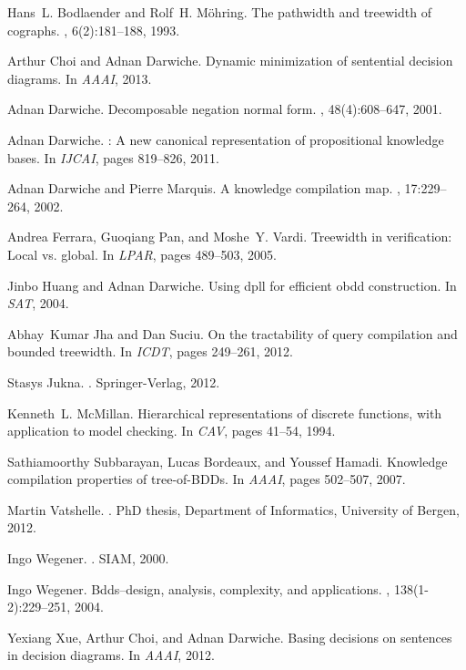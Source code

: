 \documentclass{article}
\begin{document}
\begin{thebibliography}{10}

Hans~L. Bodlaender and Rolf~H. M{\"o}hring.
\newblock The pathwidth and treewidth of cographs.
, 6(2):181--188, 1993.

Arthur Choi and Adnan Darwiche.
\newblock Dynamic minimization of sentential decision diagrams.
\newblock In {\em AAAI}, 2013.

Adnan Darwiche.
\newblock Decomposable negation normal form.
, 48(4):608--647, 2001.

Adnan Darwiche.
: A new canonical representation of propositional knowledge
  bases.
\newblock In {\em IJCAI}, pages 819--826, 2011.

Adnan Darwiche and Pierre Marquis.
\newblock A knowledge compilation map.
, 17:229--264, 2002.

Andrea Ferrara, Guoqiang Pan, and Moshe~Y. Vardi.
\newblock Treewidth in verification: Local vs. global.
\newblock In {\em LPAR}, pages 489--503, 2005.

Jinbo Huang and Adnan Darwiche.
\newblock Using dpll for efficient obdd construction.
\newblock In {\em SAT}, 2004.

Abhay~Kumar Jha and Dan Suciu.
\newblock On the tractability of query compilation and bounded treewidth.
\newblock In {\em ICDT}, pages 249--261, 2012.

Stasys Jukna.
.
\newblock Springer-Verlag, 2012.

Kenneth~L. McMillan.
\newblock Hierarchical representations of discrete functions, with application
  to model checking.
\newblock In {\em CAV}, pages 41--54, 1994.

Sathiamoorthy Subbarayan, Lucas Bordeaux, and Youssef Hamadi.
\newblock Knowledge compilation properties of tree-of-{B}{D}{D}s.
\newblock In {\em AAAI}, pages 502--507, 2007.

Martin Vatshelle.
.
\newblock PhD thesis, Department of Informatics, University of Bergen, 2012.

Ingo Wegener.
.
\newblock SIAM, 2000.

Ingo Wegener.
\newblock Bdds--design, analysis, complexity, and applications.
, 138(1-2):229--251, 2004.

Yexiang Xue, Arthur Choi, and Adnan Darwiche.
\newblock Basing decisions on sentences in decision diagrams.
\newblock In {\em AAAI}, 2012.

\end{thebibliography}
\end{document}
